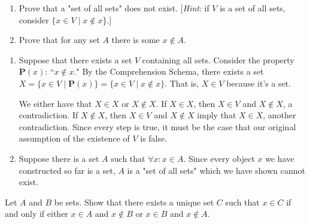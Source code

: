 \documentclass[class=report, crop=false]{standalone}
\begin{document}
  \begin{problem}
    \hfill
    \begin{enumerate}[label={(\alph*)}]
      \item Prove that a "set of all sets" does not exist. [\textit{Hint}: if \(V\) is a set of all sets, consider \(\{x \in V \mid x \notin x\)\}.]

      \item Prove that for any set \(A\) there is some \(x \notin A\).
    \end{enumerate}
  \end{problem}

  \begin{solution}
    \hfill
    \begin{enumerate}[label={(\alph*)}]
      \item Suppose that there exists a set \(V\) containing all sets. Consider the property \(\textbf{P}(x)\): ``\(x \notin x\)." By the Comprehension Schema, there exists a set \(X = \{x \in V \mid \textbf{P}(x)\} = \{x \in V \mid x \notin x\}\). That is, \(X \in V\) because it's a set.

      We either have that \(X \in X\) or \(X \notin X\). If \(X \in X\), then \(X \in V\) and \(X \notin X\), a contradiction. If \(X \notin X\), then \(X \in V\) and \(X \notin X\) imply that \(X \in X\), another contradiction.
      Since every step is true, it must be the case that our original assumption of the existence of \(V\) is false.

      \item Suppose there is a set \(A\) such that \(\forall x : x \in A\). Since every object \(x\) we have constructed so far is a set, \(A\) is a "set of all sets" which we have shown cannot exist.
    \end{enumerate}
  \end{solution}


  \begin{problem}
    Let \(A\) and \(B\) be sets. Show that there exists a unique set \(C\) such that \(x \in C\) if and only if either \(x \in A\) and \(x \notin B\) or \(x \in B\) and \(x \notin A\).
  \end{problem}
\end{document}
